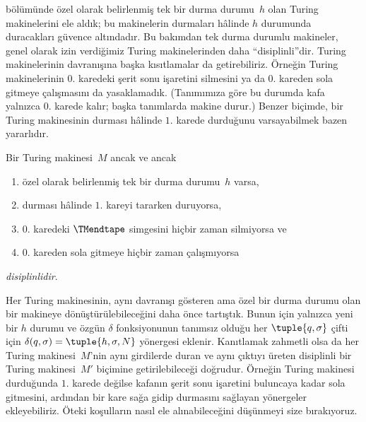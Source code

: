 


\begin{explain}
 bölümünde özel olarak belirlenmiş tek bir durma durumu~$h$
olan Turing makinelerini ele aldık; bu makinelerin durmaları hâlinde $h$
durumunda duracakları güvence altındadır. Bu bakımdan tek durma durumlu
makineler, genel olarak izin verdiğimiz Turing makinelerinden daha
``disiplinli''dir. Turing makinelerinin davranışına başka kısıtlamalar da
getirebiliriz. Örneğin Turing makinelerinin $0$. karedeki şerit sonu
işaretini silmesini ya da $0$. kareden sola gitmeye çalışmasını da
yasaklamadık. (Tanımımıza göre bu durumda kafa yalnızca $0$. karede kalır;
başka tanımlarda makine durur.) Benzer biçimde, bir Turing makinesinin
durması hâlinde $1$. karede durduğunu varsayabilmek bazen yararlıdır.
\end{explain}

\begin{defn}
Bir Turing makinesi~$M$ ancak ve ancak
\begin{enumerate}
    \item özel olarak belirlenmiş tek bir durma durumu~$h$ varsa,
    \item durması hâlinde $1$. kareyi tararken duruyorsa,
    \item $0$. karedeki $\TMendtape$ simgesini hiçbir zaman silmiyorsa ve
    \item $0$. kareden sola gitmeye hiçbir zaman çalışmıyorsa
\end{enumerate}
\emph{disiplinlidir}.
\end{defn}

\begin{explain}
Her Turing makinesinin, aynı davranışı gösteren ama özel bir durma durumu olan
bir makineye dönüştürülebileceğini daha önce tartıştık. Bunun için yalnızca
yeni bir $h$ durumu ve özgün $\delta$ fonksiyonunun tanımsız olduğu her
$\tuple{q,\sigma}$ çifti için
$\delta(q,\sigma)=\tuple{h,\sigma,N}$ yönergesi eklenir. Kanıtlamak zahmetli
olsa da her Turing makinesi~$M$'nin aynı girdilerde duran ve aynı çıktıyı
üreten disiplinli bir Turing makinesi~$M'$ biçimine getirilebileceği
doğrudur. Örneğin Turing makinesi durduğunda $1$. karede değilse kafanın şerit
sonu işaretini buluncaya kadar sola gitmesini, ardından bir kare sağa gidip
durmasını sağlayan yönergeler ekleyebiliriz. Öteki koşulların nasıl ele
alınabileceğini düşünmeyi size bırakıyoruz.
\end{explain}

